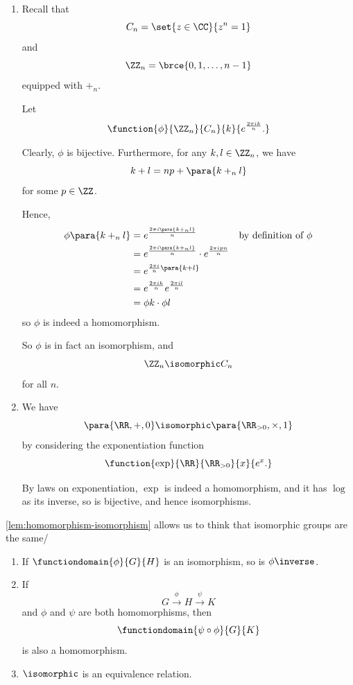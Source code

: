 \begin{examples}
    \begin{enumerate}
        \item Recall that
        \[
            C_n = \set{z \in \CC}{z^n = 1}
        \]
        and
        \[
            \ZZ_n = \brce{0, 1, \ldots, n - 1}
        \]
        equipped with \(+_n\).

        Let
        \[
            \function{\phi}{\ZZ_n}{C_n}{k}{e^{\frac{2 \pi i k}{n}}.}
        \]

        Clearly, \(\phi\) is bijective. Furthermore, for any \(k, l \in \ZZ_{n}\), we have
        \[
            k + l = np + \para{k +_n l}
        \]
        for some \(p \in \ZZ\).

        Hence,
        \begin{align*}
            \phi\para{k +_n l} &= e^{\frac{2 \pi i \para{k +_n l}}{n}} && \text{by definition of }\phi \\
            &= e^{\frac{2 \pi i \para{k +_n l}}{n}} \cdot e^{\frac{2 \pi i p n}{n}} \\
            &= e^{\frac{2 \pi i}{n} \para{k + l}} \\
            &= e^{\frac{2 \pi i k}{n}} e^{\frac{2 \pi i l}{n}} \\
            &= \phi{k} \cdot \phi{l}
        \end{align*}
        so \(\phi\) is indeed a homomorphism.

        So \(\phi\) is in fact an isomorphism, and
        \[
            \ZZ_{n} \isomorphic C_n
        \]
        for all \(n\).

        \item We have
        \[
            \para{\RR, +, 0} \isomorphic \para{\RR_{>0}, \times, 1}
        \]
        by considering the exponentiation function
        \[
            \function{\exp}{\RR}{\RR_{>0}}{x}{e^x.}
        \]

        By laws on exponentiation, \(\exp\) is indeed a homomorphism, and it has \(\log\) as its inverse, so is bijective, and hence isomorphisms.
    \end{enumerate}
\end{examples}

\autoref{lem:homomorphism-isomorphism} allows us to think that isomorphic groups are the same/

\begin{lemma}
    \label{lem:homomorphism-isomorphism}%
    \begin{enumerate}
        \item If \(\functiondomain{\phi}{G}{H}\) is an isomorphism, so is \(\phi \inverse\).
        \item If
        \[
            G \xrightarrow{\phi} H \xrightarrow{\psi} K
        \]
        and \(\phi\) and \(\psi\) are both homomorphisms, then
        \[
            \functiondomain{\psi \circ \phi}{G}{K}
        \]
        is also a homomorphism.
        \item \(\isomorphic\) is an equivalence relation.
    \end{enumerate}
\end{lemma}

